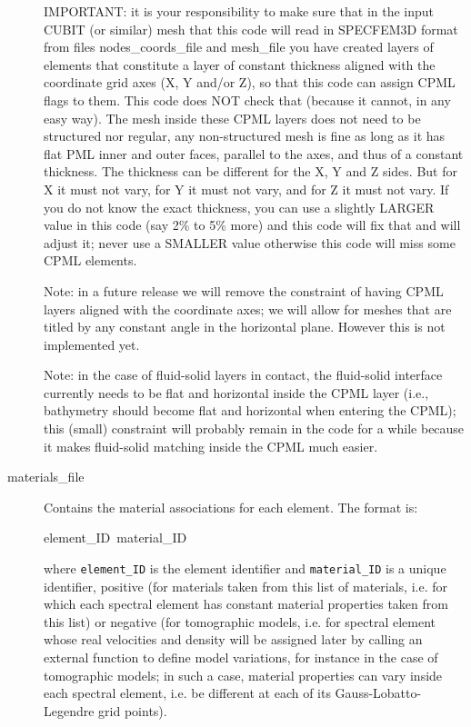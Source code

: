 \begin{description}
IMPORTANT: it is your responsibility to make sure that in the input
CUBIT (or similar) mesh that this code will read in SPECFEM3D format
from files \textquotedbl{}nodes\_coords\_file\textquotedbl{} and \textquotedbl{}mesh\_file\textquotedbl{}
you have created layers of elements that constitute a layer of constant
thickness aligned with the coordinate grid axes (X, Y and/or Z), so
that this code can assign CPML flags to them. This code does NOT check
that (because it cannot, in any easy way). The mesh inside these CPML
layers does not need to be structured nor regular, any non-structured
mesh is fine as long as it has flat PML inner and outer faces, parallel
to the axes, and thus of a constant thickness. The thickness can be
different for the X, Y and Z sides. But for X it must not vary, for
Y it must not vary, and for Z it must not vary. If you do not know
the exact thickness, you can use a slightly LARGER value in this code
(say 2\% to 5\% more) and this code will fix that and will adjust
it; never use a SMALLER value otherwise this code will miss some CPML
elements.


Note: in a future release we will remove the constraint of having
CPML layers aligned with the coordinate axes; we will allow for meshes
that are titled by any constant angle in the horizontal plane. However
this is not implemented yet.


Note: in the case of fluid-solid layers in contact, the fluid-solid
interface currently needs to be flat and horizontal inside the CPML
layer (i.e., bathymetry should become flat and horizontal when entering
the CPML); this (small) constraint will probably remain in the code
for a while because it makes fluid-solid matching inside the CPML
much easier.

\item [{materials\_file}] Contains the material associations for each element.
The format is:

\begin{lyxcode}
element\_ID~material\_ID
\end{lyxcode}

where \texttt{element\_ID} is the element identifier and \texttt{material\_ID}
is a unique identifier, positive (for materials taken from this list
of materials, i.e. for which each spectral element has constant material
properties taken from this list) or negative (for tomographic models,
i.e. for spectral element whose real velocities and density will be
assigned later by calling an external function to define model variations,
for instance in the case of tomographic models; in such a case, material
properties can vary inside each spectral element, i.e. be different
at each of its Gauss-Lobatto-Legendre grid points).


\end{description}
